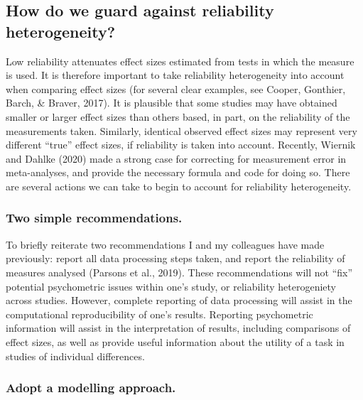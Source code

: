 \documentclass[
  english,
  man,floatsintext]{apa6}
\begin{document}
\hypertarget{how-do-we-guard-against-reliability-heterogeneity}{%
\subsection{How do we guard against reliability heterogeneity?}\label{how-do-we-guard-against-reliability-heterogeneity}}

Low reliability attenuates effect sizes estimated from tests in which the measure is used. It is therefore important to take reliability heterogeneity into account when comparing effect sizes (for several clear examples, see Cooper, Gonthier, Barch, \& Braver, 2017). It is plausible that some studies may have obtained smaller or larger effect sizes than others based, in part, on the reliability of the measurements taken. Similarly, identical observed effect sizes may represent very different \enquote{true} effect sizes, if reliability is taken into account. Recently, Wiernik and Dahlke (2020) made a strong case for correcting for measurement error in meta-analyses, and provide the necessary formula and code for doing so. There are several actions we can take to begin to account for reliability heterogeneity.

\hypertarget{two-simple-recommendations.}{%
\subsubsection{Two simple recommendations.}\label{two-simple-recommendations.}}

To briefly reiterate two recommendations I and my colleagues have made previously: report all data processing steps taken, and report the reliability of measures analysed (Parsons et al., 2019). These recommendations will not \enquote{fix} potential psychometric issues within one's study, or reliability heterogeniety across studies. However, complete reporting of data processing will assist in the computational reproducibility of one's results. Reporting psychometric information will assist in the interpretation of results, including comparisons of effect sizes, as well as provide useful information about the utility of a task in studies of individual differences.

\hypertarget{adopt-a-modelling-approach.}{%
\subsubsection{Adopt a modelling approach.}\label{adopt-a-modelling-approach.}}
\end{document}
